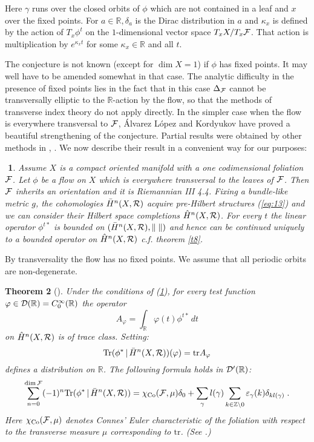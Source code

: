 \documentclass[11pt,leqno]{article}
\newcommand{\Co}{\mathrm{Co}}
\newcommand{\R}{{\mathbb{R}}}
\newcommand{\Z}{{\mathbb{Z}}}
\newcommand{\Tr}{\mathrm{Tr}}
\newcommand{\tr}{\mathrm{tr}}
\newcommand{\Dh}{{\cal D}}
\newcommand{\Fh}{{\cal F}}
\newcommand{\Rh}{{\cal R}}
\newcommand{\oH}{\bar{H}}
\newcommand{\ohne}{\setminus}
\newcommand{\tei}{\, | \,}
\newtheorem{theorem}{Theorem}[section]
\newtheorem{punkt}[theorem]{$\!\!$}
\begin{document}
Here $\gamma$ runs over the closed orbits of $\phi$ which are not contained in a leaf and $x$ over the fixed points. For $a \in \R , \delta_a$ is the Dirac distribution in $a$ and $\kappa_x$ is defined by the action of $T_x \phi^t$ on the $1$-dimensional vector space $T_x X / T_x \Fh$. That action is multiplication by $e^{\kappa_x t}$ for some $\kappa_x \in \R$ and all $t$.

The conjecture is not known (except for $\dim X = 1$) if $\phi$ has fixed points. It may well have to be amended somewhat in that case. The analytic difficulty in the presence of fixed points lies in the fact that in this case $\Delta_{\Fh}$ cannot be transversally elliptic to the $\R$-action by the flow, so that the methods of transverse index theory do not apply directly. In the simpler case when the flow is everywhere transversal to $\Fh$, \'Alvarez L\'opez and Kordyukov have proved a  beautiful strengthening of the conjecture. Partial results were obtained by other methods in \cite{Laz}, \cite{DS2}. We now describe their result in a convenient way for our purposes:

\begin{punkt}
  \label{t6} \rm
Assume $X$ is a compact oriented manifold with a one codimensional foliation $\Fh$. Let $\phi$ be a flow on $X$ which is everywhere transversal to the leaves of $\Fh$. Then $\Fh$ inherits an orientation and it is Riemannian \cite{Go} III 4.4. Fixing a bundle-like metric $g$, the cohomologies $\oH^n (X,\Rh)$ acquire pre-Hilbert structures (\ref{eq:13}) and we can consider their Hilbert space completions $\hat{H}^n (X,\Rh)$. For every $t$ the linear operator $\phi^{t*}$ is bounded on $(\oH^n (X,\Rh) , \| \; \|)$ and hence can be continued uniquely to a bounded operator on $\hat{H}^n (X,\Rh)$ c.f. theorem \ref{t8}.
\end{punkt}

By transversality the flow has no fixed points. We assume that all periodic orbits are non-degenerate.

\begin{theorem}[\cite{AK2}]
  \label{t7}
Under the conditions of (\ref{t6}), for every test function $\varphi \in \Dh (\R) = C^{\infty}_0 (\R)$ the operator
\[
A_{\varphi} = \int_{\R} \varphi (t) \phi^{t*} \, dt
\]
on $\hat{H}^n (X,\Rh)$ is of trace class. Setting:
\[
\Tr (\phi^* \tei \oH^n (X,\Rh)) (\varphi) = \tr A_{\varphi}
\]
defines a distribution on $\R$. The following formula holds in $\Dh' (\R)$:
\begin{equation}
  \label{eq:21}
  \sum^{\dim \Fh}_{n=0} (-1)^n \Tr (\phi^* \tei \oH^n (X,\Rh)) = \chi_{\Co} (\Fh , \mu) \delta_0 + \sum_{\gamma} l (\gamma) \sum_{k \in \Z \ohne 0} \varepsilon_{\gamma} (k) \delta_{kl (\gamma)} \; .
\end{equation}
Here $\chi_{\Co} (\Fh , \mu)$ denotes Connes' Euler characteristic of the foliation with respect to the transverse measure $\mu$ corresponding to $\tr$. (See \cite{MS}.)
\end{theorem}
\end{document}
